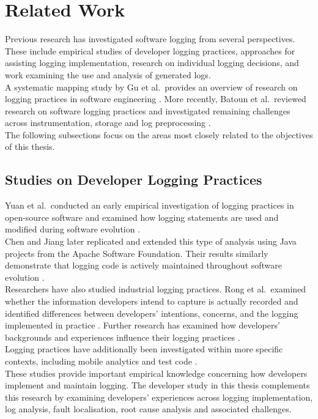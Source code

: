\section{Related Work}
\label{sec:related_work}

Previous research has investigated software logging from several perspectives. 
These include empirical studies of developer logging practices, approaches for assisting logging implementation, 
research on individual logging decisions, and work examining the use and analysis of generated logs.
\\
A systematic mapping study by Gu et al.\ provides an overview of research on logging practices 
in software engineering \cite{gu2023loggingpracticesinsoftwareengineering}. 
More recently, Batoun et al.\ reviewed research on software logging practices 
and investigated remaining challenges across instrumentation, storage and log preprocessing \cite{batoun2024aliteraturereview}.
\\
The following subsections focus on the areas most closely related to the objectives of this thesis.

\subsection{Studies on Developer Logging Practices}

Yuan et al.\ conducted an early empirical investigation of logging practices in open-source software
and examined how logging statements are used and modified during software evolution \cite{yuan2012characterzingloggingpractices}.
\\
Chen and Jiang later replicated and extended this type of analysis using Java projects from the Apache Software Foundation.
Their results similarly demonstrate that logging code is actively maintained throughout software evolution \cite{chen2017characterizingloggingpractices}.
\\
Researchers have also studied industrial logging practices.
Rong et al.\ examined whether the information developers intend to capture is 
actually recorded and identified differences between developers' intentions, 
concerns, and the logging implemented in practice \cite{rong2020canyoucaputreinformation}.
Further research has examined how developers' backgrounds and experiences influence their logging practices \cite{rong2023howdodevelopers}.
\\
Logging practices have additionally been investigated within more specific contexts,
including mobile analytics \cite{harty2021loggingpracticewithmobileanalytics} and test code \cite{zhang2022studyingloggingpractice}.
\\
These studies provide important empirical knowledge concerning how developers implement
and maintain logging. The developer study in this thesis complements this research 
by examining developers' experiences across logging implementation, log analysis, 
fault localisation, root cause analysis and associated challenges.

